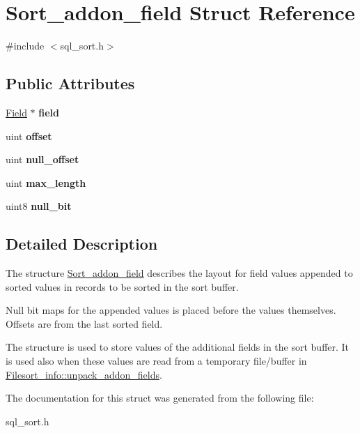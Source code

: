 \hypertarget{structSort__addon__field}{}\section{Sort\+\_\+addon\+\_\+field Struct Reference}
\label{structSort__addon__field}


{\ttfamily \#include $<$sql\+\_\+sort.\+h$>$}

\subsection*{Public Attributes}
\begin{DoxyCompactItemize}
\item 
\mbox{\label{structSort__addon__field_a3ca66ca0518541ae9aadfd59f8741def}} 
\mbox{\hyperlink{classField}{Field}} $\ast$ {\bfseries field}
\item 
\mbox{\label{structSort__addon__field_a89dc1e0afe5e907ec7818981f5c298d5}} 
uint {\bfseries offset}
\item 
\mbox{\label{structSort__addon__field_a5e77859ee38bf35d09625b8111852815}} 
uint {\bfseries null\+\_\+offset}
\item 
\mbox{\label{structSort__addon__field_a2812d24c6a8f17d50d1455a203bdfbe2}} 
uint {\bfseries max\+\_\+length}
\item 
\mbox{\label{structSort__addon__field_a704635b7b09e028fbc025719a1452b77}} 
uint8 {\bfseries null\+\_\+bit}
\end{DoxyCompactItemize}


\subsection{Detailed Description}
The structure \mbox{\hyperlink{structSort__addon__field}{Sort\+\_\+addon\+\_\+field}} describes the layout for field values appended to sorted values in records to be sorted in the sort buffer.

Null bit maps for the appended values is placed before the values themselves. Offsets are from the last sorted field.

The structure is used to store values of the additional fields in the sort buffer. It is used also when these values are read from a temporary file/buffer in \textquotesingle{}\mbox{\hyperlink{classFilesort__info_a972ae7583ff223e13df5b6d6cf4d0de8}{Filesort\+\_\+info\+::unpack\+\_\+addon\+\_\+fields}}\textquotesingle{}. 

The documentation for this struct was generated from the following file\+:\begin{DoxyCompactItemize}
\item 
sql\+\_\+sort.\+h\end{DoxyCompactItemize}
